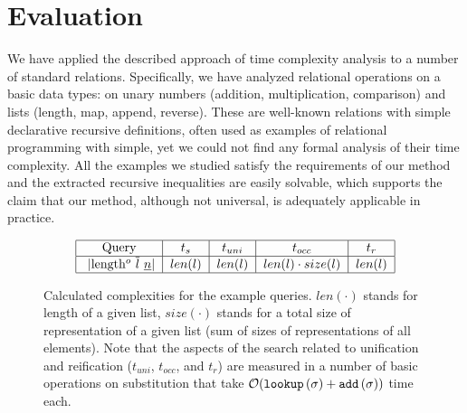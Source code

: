 \section{Evaluation}
\label{sec:evaluation}

We have applied the described approach of time complexity analysis to a number of standard \mK relations. Specifically, we have analyzed relational operations on a basic data types: on unary numbers (addition, multiplication, comparison) and lists (length, map, append, reverse). These are well-known relations with simple declarative recursive definitions, often used as examples of relational programming with simple, yet we could not find any formal analysis of their time complexity. All the examples we studied satisfy the requirements of our method and the extracted recursive inequalities are easily solvable, which supports the claim that our method, although not universal, is adequately applicable in practice.

\begin{figure}[t]
      \[ \begin{tabular}{|c|c|c|c|c|}
           \hline
           Query & $t_s$ & $t_{uni}$ & $t_{occ}$ & $t_r$  \\
           \hline
           \lstinline|length$^o$ $\overline{l}$ $\underline{n}$| & $len(l)$ & $len(l)$ & $len(l) \cdot size(l)$ & $len(l)$  \\
           \hline
      \end{tabular} \]
  \caption{Calculated complexities for the example queries. $len(\cdot)$ stands for length of a given list, $size(\cdot)$ stands for a total size of representation of a given list (sum of sizes of representations of all elements). Note that the aspects of the search related to unification and reification ($t_{uni}$, $t_{occ}$, and $t_r$) are measured in a number of basic operations on substitution that take $\mathcal{O}(\texttt{lookup}\,(\sigma) + \texttt{add}\,(\sigma))$ time each. }
  \label{fig:examples_all_complexities}
\end{figure}


